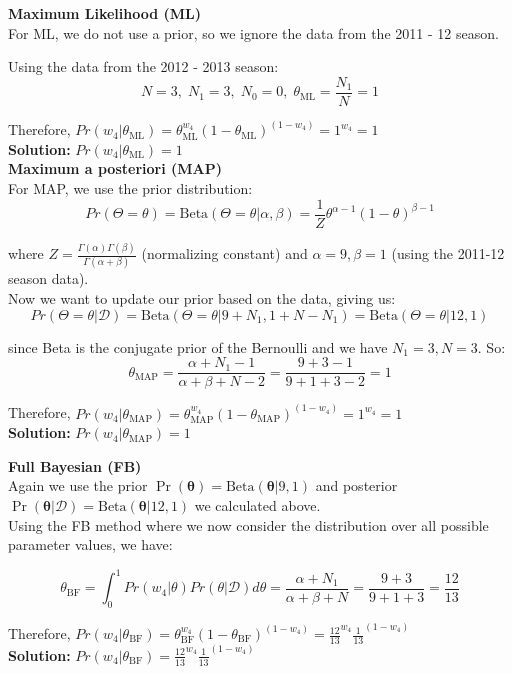 \documentclass[12pt]{article}
\begin{document}
\textbf{Maximum Likelihood (ML)} \\

For ML, we do not use a prior, so we ignore the data from the 2011 - 12 season.

Using the data from the 2012 - 2013 season:
$$
N = 3, \; N_1 = 3, \; N_0 = 0, \; \theta_{\text{ML}} = \frac{N_1}{N} = 1
$$

Therefore, $Pr(w_4 | \theta_{\text{ML}}) = \theta_{\text{ML}}^{w_4}(1-\theta_{\text{ML}})^{(1-w_4)} = 1^{w_4} = 1$ \\

\indent \textbf{Solution:} $Pr(w_4 | \theta_{\text{ML}}) = 1$\\

\textbf{Maximum a posteriori (MAP)} \\

For MAP, we use the prior distribution: 
$$Pr(\Theta=\theta) = \text{Beta}(\Theta=\theta |\alpha, \beta) = \frac{1}{Z}\theta^{\alpha-1}(1-\theta)^{\beta-1}$$ 

where $Z = \frac{\Gamma(\alpha)\Gamma(\beta)}{\Gamma(\alpha+\beta)}$ (normalizing constant) and $\alpha=9, \beta=1$ (using the 2011-12 season data). \\

Now we want to update our prior based on the data, giving us:
$$Pr(\Theta=\theta | \mathcal{D}) = \text{Beta}(\Theta=\theta | 9 + N_1, 1 + N - N_1) = \text{Beta}(\Theta=\theta | 12, 1)$$

since Beta is the conjugate prior of the Bernoulli and we have $N_1 = 3, N = 3$. So:
$$
\theta_{\text{MAP}} = \frac{\alpha + N_1 - 1}{\alpha + \beta + N - 2} = \frac{9 + 3 - 1}{9 + 1 + 3 - 2} = 1
$$

Therefore, $Pr(w_4 | \theta_{\text{MAP}}) = \theta_{\text{MAP}}^{w_4}(1-\theta_{\text{MAP}})^{(1-w_4)} = 1^{w_4} = 1$ \\

\indent \textbf{Solution:} $Pr(w_4 | \theta_{\text{MAP}}) = 1$\\

\pagebreak

\textbf{Full Bayesian (FB)} \\

Again we use the prior $\Pr(\boldsymbol{\theta}) = \text{Beta}(\boldsymbol{\theta} | 9,1)$ and posterior $\Pr(\boldsymbol{\theta} | \mathcal{D}) = \text{Beta}(\boldsymbol{\theta} | 12,1)$ we calculated above. \\

Using the FB method where we now consider the distribution over all possible parameter values, we have:

$$
\theta_{\text{BF}} = \int^1_0 Pr(w_4 | \theta) Pr(\theta|\mathcal{D})d\theta = \frac{\alpha + N_1}{\alpha+\beta+N} = \frac{9+3}{9+1+3} = \frac{12}{13}
$$

Therefore, $Pr(w_4 | \theta_{\text{BF}}) = \theta_{\text{BF}}^{w_4}(1-\theta_{\text{BF}})^{(1-w_4)} = \frac{12}{13}^{w_4}\frac{1}{13}^{(1-w_4)}$ \\

\indent \textbf{Solution:} $Pr(w_4 | \theta_{\text{BF}}) = \frac{12}{13}^{w_4}\frac{1}{13}^{(1-w_4)}$\\
\end{document}
